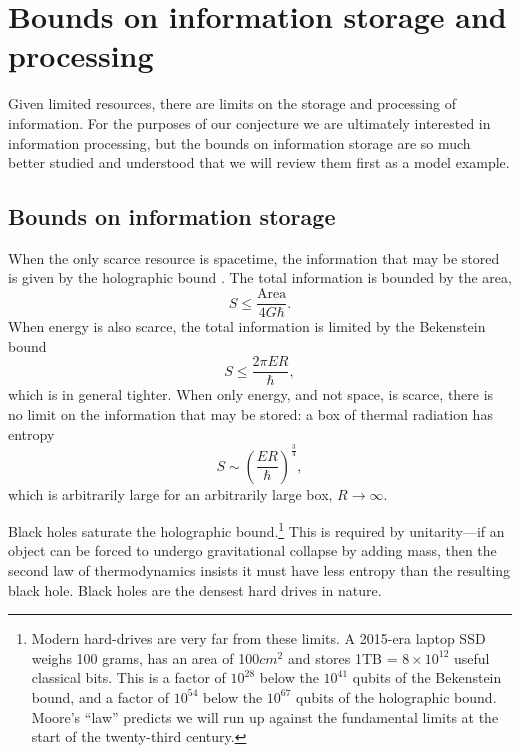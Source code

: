 \documentclass[12pt]{article}
\numberwithin{equation}{section}
\begin{document}
\section{Bounds on information storage and processing}
\label{sec:infobound}

Given limited resources, there are limits on the storage and processing of information. For the purposes of our conjecture we are ultimately interested in information processing, but the bounds on information storage are so much better studied and understood that we will review them first as a model example.


\subsection{Bounds on information storage}

When the only scarce resource is spacetime, the information that may be stored is given by the holographic bound \cite{Hooft:1993gx,Susskind:1994vu}. The total information is bounded by the area,
\begin{equation}
S \leq \frac{\textrm{Area}}{4G \hbar} .
\end{equation}
When energy is also scarce, the total information is limited by the Bekenstein bound \cite{Bekenstein:1980jp, Marolf:2003sq, Casini:2008cr}
\begin{equation}
S \leq \frac{2 \pi E R}{\hbar},
\end{equation}
which is in general tighter. When only energy, and not space, is scarce, there is no limit on the information that may be stored: a box of thermal radiation has entropy
\begin{equation}
S \sim \left(\frac{E R}{\hbar}\right)^\frac{3}{4},
\end{equation}
which is arbitrarily large for an arbitrarily large box, $R \rightarrow \infty$.




Black holes saturate the holographic bound.\footnote{Modern hard-drives are very far from these limits. A 2015-era laptop SSD weighs 100 grams, has an area of 100$cm^2$ and stores 1TB =  $8 \times 10^{12}$ useful classical bits. This is a factor of $10^{28}$ below the $10^{41}$ qubits of the Bekenstein bound, and a factor of $10^{54}$ below the $10^{67}$ qubits of the holographic bound. Moore's ``law'' predicts we will run up against the fundamental limits at the start of the twenty-third century.} This is required by unitarity---if an object can be forced to undergo gravitational collapse by adding mass, then the second law of thermodynamics insists it must have less entropy than the resulting black hole. Black holes are the densest hard drives in nature.
\end{document}
